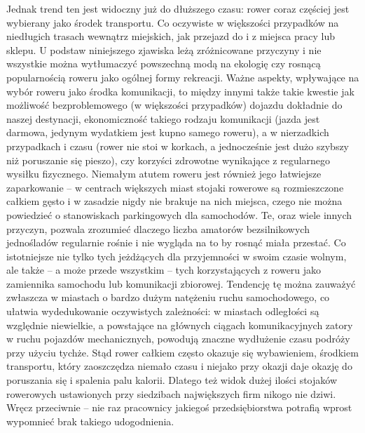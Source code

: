 Jednak trend ten jest widoczny już do dłuższego czasu: rower coraz częściej jest wybierany jako środek transportu. Co oczywiste w większości przypadków na niedługich trasach wewnątrz miejskich, jak przejazd do i z miejsca pracy lub sklepu. U podstaw niniejszego zjawiska leżą zróżnicowane przyczyny i nie wszystkie można wytłumaczyć powszechną modą na ekologię czy rosnącą popularnością roweru jako ogólnej formy rekreacji. Ważne aspekty, wpływające na wybór roweru jako środka komunikacji, to między innymi także takie kwestie jak możliwość bezproblemowego (w większości przypadków) dojazdu dokładnie do naszej destynacji, ekonomiczność takiego rodzaju komunikacji (jazda jest darmowa, jedynym wydatkiem jest kupno samego roweru), a w nierzadkich przypadkach i czasu (rower nie stoi w korkach, a jednocześnie jest dużo szybszy niż poruszanie się pieszo), czy korzyści zdrowotne wynikające z regularnego wysiłku fizycznego. Niemałym atutem roweru jest również jego łatwiejsze zaparkowanie – w centrach większych miast stojaki rowerowe są rozmieszczone całkiem gęsto i w zasadzie nigdy nie brakuje na nich miejsca, czego nie można powiedzieć o stanowiskach parkingowych dla samochodów. Te, oraz wiele innych przyczyn, pozwala zrozumieć dlaczego liczba amatorów bezsilnikowych jednośladów regularnie rośnie i nie wygląda na to by rosnąć miała przestać. Co istotniejsze nie tylko tych jeżdżących dla przyjemności w swoim czasie wolnym, ale także – a może przede wszystkim – tych korzystających z roweru jako zamiennika samochodu lub komunikacji zbiorowej. Tendencję tę można zauważyć zwłaszcza w miastach o bardzo dużym natężeniu ruchu samochodowego, co ułatwia wydedukowanie oczywistych zależności: w miastach odległości są względnie niewielkie, a powstające na głównych ciągach komunikacyjnych zatory w ruchu pojazdów mechanicznych, powodują znaczne wydłużenie czasu podróży przy użyciu tychże. Stąd rower całkiem często okazuje się wybawieniem, środkiem transportu, który zaoszczędza niemało czasu i niejako przy okazji daje okazję do poruszania się i spalenia palu kalorii. Dlatego też widok dużej ilości stojaków rowerowych ustawionych przy siedzibach największych firm nikogo nie dziwi. Wręcz przeciwnie – nie raz pracownicy jakiegoś przedsiębiorstwa potrafią wprost wypomnieć brak takiego udogodnienia.  
